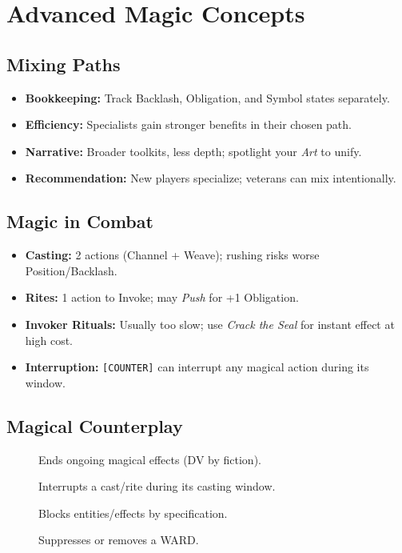 \section{Advanced Magic Concepts}
\label{sec:advanced-magic}

\subsection{Mixing Paths}
\label{subsec:mixing-paths}
\begin{itemize}
  \item \textbf{Bookkeeping:} Track Backlash, Obligation, and Symbol states separately.
  \item \textbf{Efficiency:} Specialists gain stronger benefits in their chosen path.
  \item \textbf{Narrative:} Broader toolkits, less depth; spotlight your \emph{Art} to unify.
  \item \textbf{Recommendation:} New players specialize; veterans can mix intentionally.
\end{itemize}

\subsection{Magic in Combat}
\label{subsec:magic-combat}
\begin{itemize}
  \item \textbf{Casting:} 2 actions (Channel + Weave); rushing risks worse Position/Backlash. 
  \item \textbf{Rites:} 1 action to Invoke; may \textit{Push} for +1 Obligation.
  \item \textbf{Invoker Rituals:} Usually too slow; use \textit{Crack the Seal} for instant effect at high cost.
  \item \textbf{Interruption:} \texttt{[COUNTER]} can interrupt any magical action during its window. 
\end{itemize}

\subsection{Magical Counterplay}
\label{subsec:magical-counterplay}
\begin{description}
\item[] Ends ongoing magical effects (DV by fiction). 
\item[] Interrupts a cast/rite during its casting window. 
\item[] Blocks entities/effects by specification. 
\item[] Suppresses or removes a WARD. 
\end{description}

